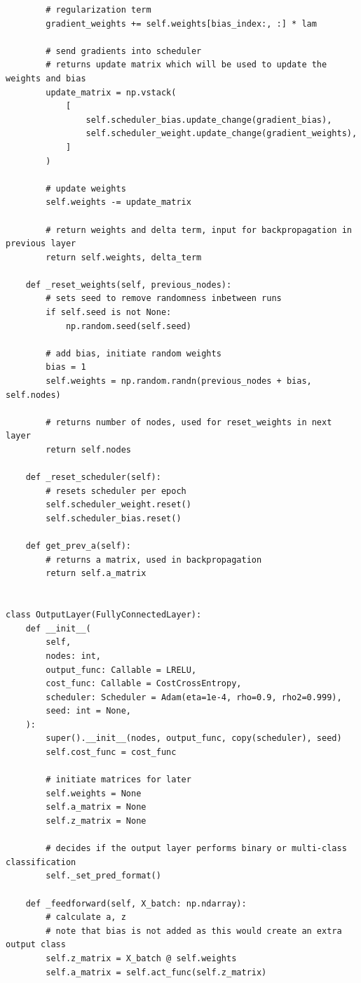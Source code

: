 \documentclass[%
oneside,                 %
final,                   %
10pt]{article}
\begin{document}
\begin{verbatim}
        # regularization term
        gradient_weights += self.weights[bias_index:, :] * lam

        # send gradients into scheduler
        # returns update matrix which will be used to update the weights and bias
        update_matrix = np.vstack(
            [
                self.scheduler_bias.update_change(gradient_bias),
                self.scheduler_weight.update_change(gradient_weights),
            ]
        )

        # update weights
        self.weights -= update_matrix

        # return weights and delta term, input for backpropagation in previous layer
        return self.weights, delta_term

    def _reset_weights(self, previous_nodes):
        # sets seed to remove randomness inbetween runs
        if self.seed is not None:
            np.random.seed(self.seed)

        # add bias, initiate random weights
        bias = 1
        self.weights = np.random.randn(previous_nodes + bias, self.nodes)

        # returns number of nodes, used for reset_weights in next layer
        return self.nodes

    def _reset_scheduler(self):
        # resets scheduler per epoch
        self.scheduler_weight.reset()
        self.scheduler_bias.reset()

    def get_prev_a(self):
        # returns a matrix, used in backpropagation
        return self.a_matrix


class OutputLayer(FullyConnectedLayer):
    def __init__(
        self,
        nodes: int,
        output_func: Callable = LRELU,
        cost_func: Callable = CostCrossEntropy,
        scheduler: Scheduler = Adam(eta=1e-4, rho=0.9, rho2=0.999),
        seed: int = None,
    ):
        super().__init__(nodes, output_func, copy(scheduler), seed)
        self.cost_func = cost_func

        # initiate matrices for later
        self.weights = None
        self.a_matrix = None
        self.z_matrix = None

        # decides if the output layer performs binary or multi-class classification
        self._set_pred_format()

    def _feedforward(self, X_batch: np.ndarray):
        # calculate a, z
        # note that bias is not added as this would create an extra output class
        self.z_matrix = X_batch @ self.weights
        self.a_matrix = self.act_func(self.z_matrix)


\end{verbatim}
\end{document}
